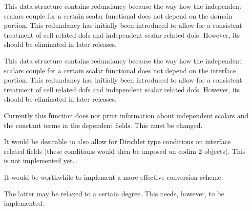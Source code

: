 \begin{DoxyRefList}
%
This data structure contains redundancy because the way how the independent scalars couple for a certain scalar functional does not depend on the domain portion. This redundancy has initially been introduced to allow for a consistent treatment of cell related dofs and independent scalar related dofs. However, its should be eliminated in later releases. 
\item[Member \mbox{\hyperlink{class_assembly_helper_a311e176038ee2b7ca0719abb384ca57b}{Assembly\+Helper$<$ spacedim $>$::coupled\+\_\+\+C\+\_\+indices\+\_\+scalar\+\_\+functionals\+\_\+interface}} ]\label{todo__todo000004}%
%
This data structure contains redundancy because the way how the independent scalars couple for a certain scalar functional does not depend on the interface portion. This redundancy has initially been introduced to allow for a consistent treatment of cell related dofs and independent scalar related dofs. However, its should be eliminated in later releases.  
\item[Member \mbox{\hyperlink{class_assembly_helper_a6a6f8ff7c1a8910d84beb7761b5c821b}{Assembly\+Helper$<$ spacedim $>$::print\+\_\+assembly\+\_\+helper\+\_\+definition}} (const bool detailed\+\_\+printout\+\_\+shapefuns=true) const]\label{todo__todo000006}%
%
Currently this function does not print information about independent scalars and the constant terms in the dependent fields. This must be changed. 
\item[Class \mbox{\hyperlink{class_dirichlet_constraint}{Dirichlet\+Constraint$<$ spacedim $>$}} ]\label{todo__todo000008}%
%
It would be desirable to also allow for Dirichlet type conditions on interface related fields (these conditions would then be imposed on codim 2 objects). This is not implemented yet. 
\item[Member \mbox{\hyperlink{class_do_f_renumbering_offset_a5df6c4b70b1394c3670ced634146c9a9}{Do\+F\+Renumbering\+Offset::dof\+\_\+offsets}} ]\label{todo__todo000009}%
%
It would be worthwhile to implement a more effective conversion scheme.  
\item[Member \mbox{\hyperlink{class_independent_field_a8e77d8d321a259bec955a71f55ef41e5}{Independent\+Field$<$ dim, spacedim $>$::is\+\_\+local}} ]\label{todo__todo000010}%
%
The latter may be relaxed to a certain degree. This needs, however, to be implemented. 
\item[Member \mbox{\hyperlink{classparallel_1_1_triangulation_system_a951181f2ad877283d458fa19db42efb2}{parallel::Triangulation\+System$<$ spacedim $>$::post\+\_\+refinement\+\_\+domain}} ()]\label{todo__todo000015}%

\end{DoxyRefList}
